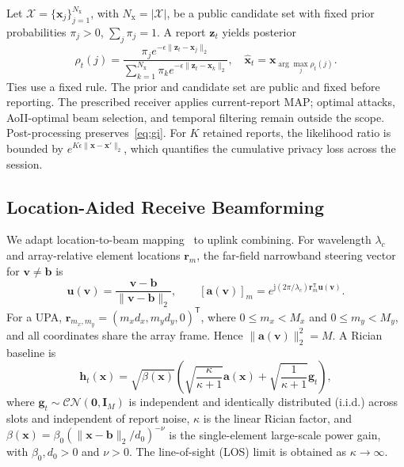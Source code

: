 Let $\mathcal X=\{\mathbf x_j\}_{j=1}^{N_{\mathrm x}}$, with $N_{\mathrm x}=|\mathcal X|$, be a public candidate set with fixed prior probabilities $\pi_j>0$, $\sum_j\pi_j=1$. A report $\mathbf z_t$ yields posterior
\begin{equation}
 \rho_t(j)=
 \frac{\pi_j e^{-\epsilon\|\mathbf z_t-\mathbf x_j\|_2}}
 {\sum_{k=1}^{N_{\mathrm x}}\pi_k e^{-\epsilon\|\mathbf z_t-\mathbf x_k\|_2}},
 \quad
 \widehat{\mathbf x}_t=\mathbf x_{\arg\max_j\rho_t(j)}.
 \label{eq:map}
\end{equation}
Ties use a fixed rule. The prior and candidate set are public and fixed before reporting. The prescribed receiver applies current-report MAP; optimal attacks, AoII-optimal beam selection, and temporal filtering remain outside the scope. Post-processing preserves~\eqref{eq:gi}. For $K$ retained reports, the likelihood ratio is bounded by $e^{K\epsilon\|\mathbf x-\mathbf x'\|_2}$, which quantifies the cumulative privacy loss across the session.

\subsection{Location-Aided Receive Beamforming}
We adapt location-to-beam mapping~\cite{lemagoarou2022location} to uplink combining. For wavelength $\lambda_c$ and array-relative element locations $\mathbf r_m$, the far-field narrowband steering vector for $\mathbf v\ne\mathbf b$ is
\begin{equation}
 \mathbf u(\mathbf v)=\frac{\mathbf v-\mathbf b}{\|\mathbf v-\mathbf b\|_2},
 \qquad
 [\mathbf a(\mathbf v)]_m
 =e^{\mathrm j(2\pi/\lambda_c)\mathbf r_m^{\mathsf T}\mathbf u(\mathbf v)}.
 \label{eq:array}
\end{equation}
For a UPA, $\mathbf r_{m_x,m_y}=(m_xd_x,m_yd_y,0)^{\mathsf T}$, where $0\le m_x<M_x$ and $0\le m_y<M_y$, and all coordinates share the array frame. Hence $\|\mathbf a(\mathbf v)\|_2^2=M$. A Rician baseline is
\begin{equation}
 \mathbf h_t(\mathbf x)=\sqrt{\beta(\mathbf x)}
 \left(\sqrt{\frac{\kappa}{\kappa+1}}\mathbf a(\mathbf x)
 +\sqrt{\frac{1}{\kappa+1}}\mathbf g_t\right),
 \label{eq:channel}
\end{equation}
where $\mathbf g_t\sim\mathcal{CN}(\mathbf0,\mathbf I_M)$ is independent and identically distributed (i.i.d.) across slots and independent of report noise, $\kappa$ is the linear Rician factor, and $\beta(\mathbf x)=\beta_0(\|\mathbf x-\mathbf b\|_2/d_0)^{-\nu}$ is the single-element large-scale power gain, with $\beta_0,d_0>0$ and $\nu>0$. The line-of-sight (LOS) limit is obtained as $\kappa\to\infty$.

